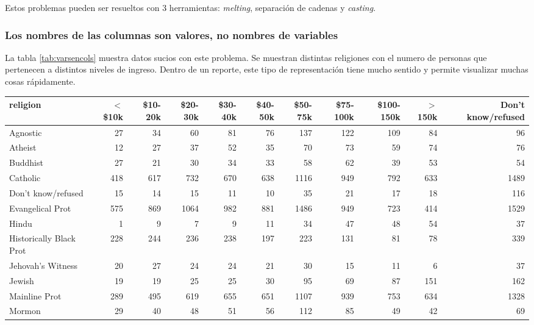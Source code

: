 \documentclass[]{article}
\begin{document}
Estos problemas pueden ser resueltos con 3 herramientas: \emph{melting},
separación de cadenas y \emph{casting}.

\subsubsection{Los nombres de las columnas son valores, no nombres de
variables}\label{los-nombres-de-las-columnas-son-valores-no-nombres-de-variables}

La tabla \ref{tab:varsencols} muestra datos sucios con este problema. Se
muestran distintas religiones con el numero de personas que pertenecen a
distintos niveles de ingreso. Dentro de un reporte, este tipo de
representación tiene mucho sentido y permite visualizar muchas cosas
rápidamente.

\begin{table}[ht]
\centering
\begingroup\tiny
\begin{tabular}{lrrrrrrrrrr}
  \hline
religion & $<$\$10k & \$10-20k & \$20-30k & \$30-40k & \$40-50k & \$50-75k & \$75-100k & \$100-150k & $>$150k & Don't know/refused \\ 
  \hline
Agnostic &  27 &  34 &  60 &  81 &  76 & 137 & 122 & 109 &  84 &  96 \\ 
  Atheist &  12 &  27 &  37 &  52 &  35 &  70 &  73 &  59 &  74 &  76 \\ 
  Buddhist &  27 &  21 &  30 &  34 &  33 &  58 &  62 &  39 &  53 &  54 \\ 
  Catholic & 418 & 617 & 732 & 670 & 638 & 1116 & 949 & 792 & 633 & 1489 \\ 
  Don’t know/refused &  15 &  14 &  15 &  11 &  10 &  35 &  21 &  17 &  18 & 116 \\ 
  Evangelical Prot & 575 & 869 & 1064 & 982 & 881 & 1486 & 949 & 723 & 414 & 1529 \\ 
  Hindu &   1 &   9 &   7 &   9 &  11 &  34 &  47 &  48 &  54 &  37 \\ 
  Historically Black Prot & 228 & 244 & 236 & 238 & 197 & 223 & 131 &  81 &  78 & 339 \\ 
  Jehovah's Witness &  20 &  27 &  24 &  24 &  21 &  30 &  15 &  11 &   6 &  37 \\ 
  Jewish &  19 &  19 &  25 &  25 &  30 &  95 &  69 &  87 & 151 & 162 \\ 
  Mainline Prot & 289 & 495 & 619 & 655 & 651 & 1107 & 939 & 753 & 634 & 1328 \\ 
  Mormon &  29 &  40 &  48 &  51 &  56 & 112 &  85 &  49 &  42 &  69 \\ 

\end{tabular}
\end{table}
\end{document}
